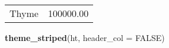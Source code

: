 \documentclass[]{article}
\newenvironment{Shaded}{\begin{snugshade}}{\end{snugshade}}
\newcommand{\KeywordTok}[1]{\textcolor[rgb]{0.13,0.29,0.53}{\textbf{{#1}}}}
\newcommand{\DataTypeTok}[1]{\textcolor[rgb]{0.13,0.29,0.53}{{#1}}}
\newcommand{\OtherTok}[1]{\textcolor[rgb]{0.56,0.35,0.01}{{#1}}}
\newcommand{\NormalTok}[1]{{#1}}
\begin{document}
\begin{table}[h]
\begin{centering}
\begin{tabularx}{0.25\textwidth}{p{} p{}}
\multicolumn{1}{p{0.125\textwidth}|}{\raggedright\rule{0pt}{\baselineskip+4pt}\hspace*{4pt}Thyme\hspace*{4pt}\rule[-4pt]{0pt}{4pt}} & \multicolumn{1}{p{0.125\textwidth}}{\raggedright\rule{0pt}{\baselineskip+4pt}\hspace*{4pt}100000.00\hspace*{4pt}\rule[-4pt]{0pt}{4pt}} \tabularnewline[-0.5pt]
\end{tabularx}
\par\end{centering}
\end{table}

\FloatBarrier

\begin{Shaded}
\begin{Highlighting}[]
\KeywordTok{theme_striped}\NormalTok{(ht, }\DataTypeTok{header_col =} \OtherTok{FALSE}\NormalTok{)}
\end{Highlighting}
\end{Shaded}
\end{document}
